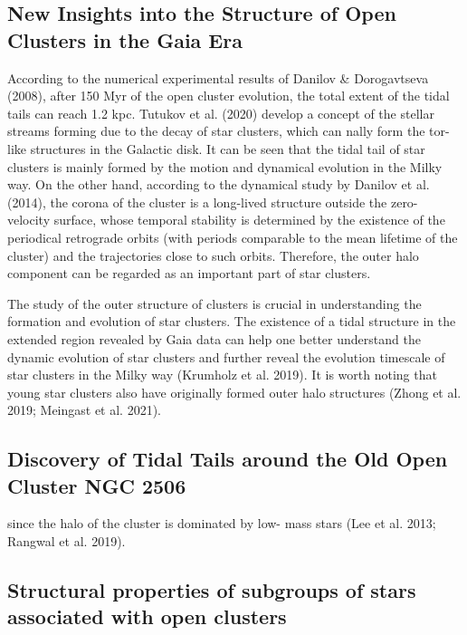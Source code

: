 \documentclass[../main.tex]{subfiles}
\begin{document}
{\subsection{New Insights into the Structure of Open Clusters in the Gaia Era}

According to the numerical experimental results of Danilov &
Dorogavtseva (2008), after 150 Myr of the open cluster
evolution, the total extent of the tidal tails can reach 1.2 kpc.
Tutukov et al. (2020) develop a concept of the stellar streams
forming due to the decay of star clusters, which can nally
form the tor-like structures in the Galactic disk. It can be seen
that the tidal tail of star clusters is mainly formed by the motion
and dynamical evolution in the Milky way. On the other hand,
according to the dynamical study by Danilov et al. (2014), the
corona of the cluster is a long-lived structure outside the zero-
velocity surface, whose temporal stability is determined by the existence of the periodical retrograde orbits (with periods
comparable to the mean lifetime of the cluster) and the
trajectories close to such orbits. Therefore, the outer halo
component can be regarded as an important part of star clusters.

The study of the outer structure of clusters is crucial in
understanding the formation and evolution of star clusters. The
existence of a tidal structure in the extended region revealed by
Gaia data can help one better understand the dynamic evolution
of star clusters and further reveal the evolution timescale of star
clusters in the Milky way (Krumholz et al. 2019). It is worth
noting that young star clusters also have originally formed
outer halo structures (Zhong et al. 2019; Meingast et al. 2021).

\subsection{Discovery of Tidal Tails around the Old Open Cluster NGC 2506}

since the halo of the cluster is dominated by low-
mass stars (Lee et al. 2013; Rangwal et al. 2019).

\subsection{Structural properties of subgroups of stars associated with open clusters}

}
\end{document}
